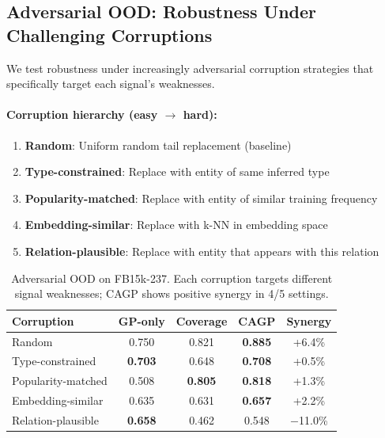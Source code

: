 \subsection{Adversarial OOD: Robustness Under Challenging Corruptions}

We test robustness under increasingly adversarial corruption strategies that specifically target each signal's weaknesses.

\paragraph{Corruption hierarchy (easy $\to$ hard):}
\begin{enumerate}
    \item \textbf{Random}: Uniform random tail replacement (baseline)
    \item \textbf{Type-constrained}: Replace with entity of same inferred type
    \item \textbf{Popularity-matched}: Replace with entity of similar training frequency
    \item \textbf{Embedding-similar}: Replace with k-NN in embedding space
    \item \textbf{Relation-plausible}: Replace with entity that appears with this relation
\end{enumerate}

\begin{table}[t]
\centering
\caption{Adversarial OOD on FB15k-237. Each corruption targets different signal weaknesses; CAGP shows positive synergy in 4/5 settings.}
\label{tab:adversarial}
\vspace{0.5em}
\begin{tabular}{lcccc}
\toprule
Corruption & GP-only & Coverage & CAGP & Synergy \\
\midrule
Random & 0.750 & 0.821 & \textbf{0.885} & +6.4\% \\
Type-constrained & \textbf{0.703} & 0.648 & \textbf{0.708} & +0.5\% \\
Popularity-matched & 0.508 & \textbf{0.805} & \textbf{0.818} & +1.3\% \\
Embedding-similar & 0.635 & 0.631 & \textbf{0.657} & +2.2\% \\
Relation-plausible & \textbf{0.658} & 0.462 & 0.548 & $-$11.0\% \\
\bottomrule
\end{tabular}
\end{table}


